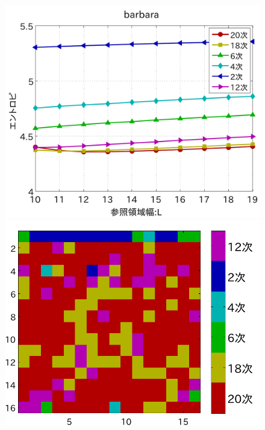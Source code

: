 \documentclass[25pt,landscape,dvipdfmx,uplatex]{foils}
\begin{document}
\begin{figure}[b]
\begin{flushleft}
\includegraphics[scale=0.75]{fig/test1/barbara.pdf}\\
\vspace{3mm}
\includegraphics[angle=-90,scale=0.75]{fig/test1/b32/yosokusikino.pdf}

\end{flushleft}
\end{figure}
\end{document}
